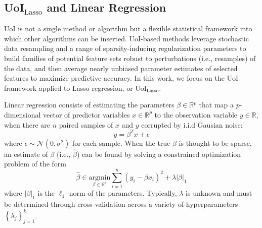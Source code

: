 \documentclass[letterpaper, 10 pt, conference]{ieeeconf}  %
\begin{document}
\subsection{ UoI$_{\text{Lasso}}$ and Linear Regression}
UoI is not a single method or algorithm but a flexible statistical framework into which other algorithms can be inserted. UoI-based methods leverage stochastic data resampling and a range of sparsity-inducing regularization parameters to build families of potential feature sets robust to perturbations (i.e., resamples) of the data, and then average nearly unbiased parameter estimates of selected features to maximize predictive accuracy. In this work, we focus on the UoI framework applied to Lasso regression, or UoI$_{\text{Lasso}}$.

Linear regression consists of estimating the parameters $\beta \in \mathbb{R}^p$ that map a $p$-dimensional vector of predictor variables $x \in \mathbb{R}^p$ to the observation variable $y\in \mathbb{R}$, when there are $n$ paired samples of $x$ and $y$ corrupted by i.i.d Gausian noise:
$$
y = \beta^T x + \epsilon
$$
where $\epsilon \sim \mathcal{N}(0, \sigma^2)$ for each sample. When the true $\beta$ is thought to be sparse, an estimate of $\beta$ (i.e., $\hat{\beta}$) can be found by solving a constrained optimization problem of the form
$$
\hat{\beta} \in \underset{\beta\in \mathbb{R}^p}{\text{argmin}} \sum_{i=1}^n(y_i - \beta x_i)^2 + \lambda |\beta|_1
$$
where $|\beta|_1$ is the $\ell_1$-norm of the parameters. Typically, $\lambda$ is unknown and must be determined through cross-validation across a variety of hyperparameters $\left\{\lambda_j\right\}_{j=1}^k$.
\end{document}
